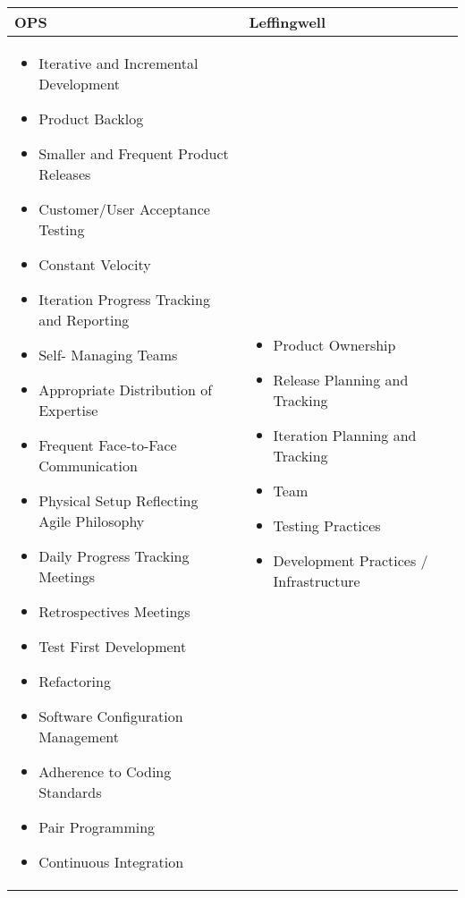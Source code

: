 \label{table:opp_pam_practices}


\begin{tabular}{| p{7.5cm} | p{7cm} |}
	\hline
	\textbf{OPS} & \textbf{Leffingwell}  \\ \hline
     	\begin{itemize}
     		\item {\color{DeepPink1} Iterative and Incremental Development}
     	    \item {\color{DeepPink1}Product Backlog}
     		\item {\color{green4}Smaller and Frequent Product Releases} 
     		\item {\color{RoyalBlue1}Customer/User {\color{green4}Acceptance Testing}}  
     		\item {\color{RoyalBlue1}Constant Velocity}		
     		\item {\color{RoyalBlue1}Iteration Progress Tracking and Reporting}
     		\item {\color{DarkRed}Self-} {\color{green4}Mana}{\color{RoyalBlue1}ging} {\color{DarkMagenta}Teams} 
     		\item {\color{DarkRed}Appropriate Distribution of Expertise}
     		\item {\color{DarkRed}Frequent Face-to-Face Communication} 
     		\item {\color{DarkRed}Physical Setup Reflecting Agile Philosophy}
     		\item {\color{DarkRed}Daily Progress Tracking Meetings}
     		\item {\color{DarkRed}Retro}{\color{RoyalBlue1}spectives} {\color{green4}Meetings} 
     		\item {\color{DarkOrange1}Test First Development}
     		\item {\color{DarkMagenta}Refactoring}
     		\item {\color{DarkMagenta}Software Configuration Management} 
     		\item {\color{DarkMagenta}Adherence to Coding Standards} 
     		\item {\color{DarkMagenta}Pair Programming}
     		\item {\color{DarkMagenta}Continuous} {\color{DarkOrange1}Integration}
     	\end{itemize} 
     	& \begin{itemize} 
     		\item {\color{DeepPink1}Product Ownership}
     		\item {\color{green4}Release Planning and Tracking}
     		\item {\color{RoyalBlue1}Iteration Planning and Tracking} 
     		\item {\color{DarkRed}Team}
     		\item {\color{DarkOrange1}Testing Practices}
     		\item {\color{DarkMagenta}Development Practices / Infrastructure}  	
 		\end{itemize} 
     \\ \hline
\end{tabular}
